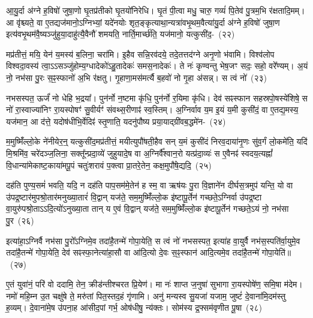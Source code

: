 {\anuvakamend[{स छन्द॑सां वी॒र्यं॑ वा ए॒व तद॒ष्टौ च॑}]}%

आ॒यु॒र्दा अ॑ग्ने ह॒विषो॑ जुषा॒णो घृ॒तप्र॑तीको घृ॒तयो॑निरेधि। घृ॒तं पी॒त्वा मधु॒ चारु॒ गव्यं॑ पि॒तेव॑ पु॒त्रम॒भि र॑क्षतादि॒मम्। आ वृ॑श्च्यते॒ वा ए॒तद्यज॑मानो॒\-ऽग्निभ्यां॒ यदे॑नयोः शृत॒ङ्कृत्याथा॒न्यत्रा॑वभृ॒थम॒वैत्या॑यु॒र्दा अ॑ग्ने ह॒विषो॑ जुषा॒ण इत्य॑वभृ॒थम॑वै॒ष्यञ्जु॑हुया॒दाहु॑त्यै॒वैनौ॑ शमयति॒ नार्ति॒मार्च्छ॑ति॒ यज॑मानो॒ यत्कुसी॑द॒-~(२२)

मप्र॑तीत्तं॒ मयि॒ येन॑ य॒मस्य॑ ब॒लिना॒ चरा॑मि। इ॒हैव सन्नि॒रव॑दये॒ तदे॒तत्तद॑ग्ने अनृ॒णो भ॑वामि। विश्व॑लोप विश्वदा॒वस्य॑ त्वा॒ऽऽसञ्जु॑होम्य॒ग्धादेको॑\-ऽहु॒तादेकः॑ समस॒नादेकः॑। ते नः॑ कृण्वन्तु भेष॒जꣳ सदः॒ सहो॒ वरे᳚ण्यम्। अ॒यं नो॒ नभ॑सा पु॒रः स॒ꣴ॒स्फानो॑ अ॒भि र॑क्षतु। गृ॒हाणा॒मस॑मर्त्यै ब॒हवो॑ नो गृ॒हा अ॑सन्न्। स त्वं नो॑~(२३)

नभसस्पत॒ ऊर्जं॑ नो धेहि भ॒द्रया᳚। पुन॑र्नो न॒ष्टमा कृ॑धि॒ पुन॑र्नो र॒यिमा कृ॑धि। देव॑ सꣴस्फान सहस्रपो॒षस्ये॑शिषे॒ स नो॑ रा॒स्वाज्या॑निꣳ रा॒यस्पोषꣳ॑ सु॒वीर्यꣳ॑ संवथ्स॒रीणाꣴ॑ स्व॒स्तिम्। अ॒ग्निर्वाव य॒म इ॒यं य॒मी कुसी॑दं॒ वा ए॒तद्य॒मस्य॒ यज॑मान॒ आ द॑त्ते॒ यदोष॑धीभि॒र्वेदिꣴ॑ स्तृ॒णाति॒ यदनु॑पौष्य प्रया॒याद्ग्री॑वब॒द्धमे॑न-~(२४)

म॒मुष्मिँ॑ल्लो॒के ने॑नीयेर॒न्॒ यत्कुसी॑द॒मप्र॑तीत्तं॒ मयीत्युपौ॑षती॒हैव सन् य॒मं कुसी॑दं निरव॒दाया॑नृ॒णः सु॑व॒र्गं लो॒कमे॑ति॒ यदि॑ मि॒श्रमि॑व॒ चरे॑दञ्ज॒लिना॒ सक्तू᳚न्प्रदा॒व्ये॑ जुहुयादे॒ष वा अ॒ग्निर्वै᳚श्वान॒रो यत्प्र॑दा॒व्यः॑ स ए॒वैनꣴ॑ स्वदय॒त्यह्नां᳚ वि॒धान्या॑मेकाष्ट॒काया॑मपू॒पं चतुः॑शरावं प॒क्त्वा प्रा॒तरे॒तेन॒ कक्ष॒मुपौ॑षे॒द्यदि॒~(२५)

दह॑ति पुण्य॒समं॑ भवति॒ यदि॒ न दह॑ति पाप॒सम॑मे॒तेन॑ ह स्म॒ वा ऋष॑यः पु॒रा वि॒ज्ञाने॑न दीर्घस॒त्रमुप॑ यन्ति॒ यो वा उ॑पद्र॒ष्टार॑मुपश्रो॒तार॑मनुख्या॒तारं॑ वि॒द्वान् यज॑ते॒ सम॒मुष्मिँ॑ल्लो॒क इ॑ष्टापू॒र्तेन॑ गच्छते॒\-ऽग्निर्वा उ॑पद्र॒ष्टा वा॒युरु॑पश्रो॒ता\-ऽ\-ऽ\-दि॒त्यो॑\-ऽनुख्या॒ता तान् य ए॒वं वि॒द्वान् यज॑ते॒ सम॒मुष्मिँ॑ल्लो॒क इ॑ष्टापू॒र्तेन॑ गच्छते॒\-ऽयं नो॒ नभ॑सा पु॒र~(२६)

इत्या॑हा॒\-ऽग्निर्वै नभ॑सा पु॒रो᳚\-ऽग्निमे॒व तदा॑है॒तन्मे॑ गोपा॒येति॒ स त्वं नो॑ नभसस्पत॒ इत्या॑ह वा॒युर्वै नभ॑स॒स्पति॑र्वा॒युमे॒व तदा॑है॒तन्मे॑ गोपा॒येति॒ देव॑ सꣴस्फा॒नेत्या॑हा॒सौ वा आ॑दि॒त्यो दे॒वः स॒ꣴ॒स्फान॑ आदि॒त्यमे॒व तदा॑है॒तन्मे॑ गोपा॒येति॑॥~(२७)

{\anuvakamend[{कुसी॑द॒न्त्वन्न॑ एनमोषे॒द्यदि॑ पु॒र आ॑दि॒त्यमे॒व तदा॑है॒तन्मे॑ गोपा॒येति॑}]}%

ए॒तं युवा॑नं॒ परि॑ वो ददामि॒ तेन॒ क्रीड॑न्तीश्चरत प्रि॒येण॑। मा नः॑ शाप्त ज॒नुषा॑ सुभागा रा॒यस्पोषे॑ण॒ समि॒षा म॑देम। नमो॑ महि॒म्न उ॒त चक्षु॑षे ते॒ मरु॑तां पित॒स्तद॒हं गृ॑णामि। अनु॑ मन्यस्व सु॒यजा॑ यजाम॒ जुष्टं॑ दे॒वाना॑मि॒दम॑स्तु ह॒व्यम्। दे॒वाना॑मे॒ष उ॑पना॒ह आ॑सीद॒पां गर्भ॒ ओष॑धीषु॒ न्य॑क्तः। सोम॑स्य द्र॒फ्सम॑वृणीत पू॒षा~(२८)

